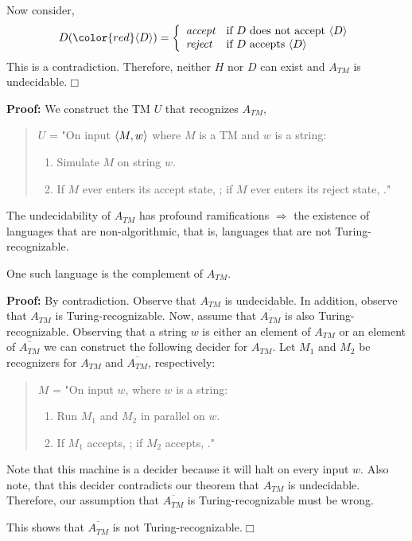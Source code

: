 \documentclass[a4paper,blends,pdf,colorBG,slideColor]{prosper}
\begin{document}
{\small
Now consider,
\[
D({\color{red}\encode{D}}) = \left \{
\begin{array}{ll}
\mbox{\accept} & \mbox{if $D$ does not accept $\encode{D}$}\\
\mbox{\reject} & \mbox{if $D$ accepts $\encode{D}$}
\end{array}
\right .
\]
This is a contradiction.  Therefore, neither $H$ nor $D$ can exist and $A_{TM}$ is
undecidable.$\Box$
}
\es

{\bf Proof:} We construct the TM $U$ that recognizes $A_{TM}$,
\begin{quote}
$U$ = "On input $\langle {M,w} \rangle$ where $M$ is a TM and $w$ is a string:
\begin{enumerate}
\item Simulate $M$ on string $w$.
\item If $M$ ever enters its accept state, \accept; if $M$ ever enters its reject state, \reject."
\end{enumerate}
\end{quote}
\es


The undecidability  of $A_{TM}$ has profound ramifications $\Rightarrow$ the existence of languages that are non-algorithmic, that is, languages that are not Turing-recognizable.


One such language is the complement of $A_{TM}$.
\es


{\bf Proof:} By contradiction. Observe that $A_{TM}$ is undecidable.  In addition, observe
that $A_{TM}$ is Turing-recognizable.  Now, assume that $\overline{A_{TM}}$ is also
Turing-recognizable.  Observing that a string $w$ is either an element of $A_{TM}$
or an element of $\overline{A_{TM}}$ we can construct the following decider for
$A_{TM}$.
Let $M_1$ and $M_2$ be recognizers for $A_{TM}$ and $\overline{A_{TM}}$, respectively:

\begin{quote}
$M$ = "On input $w$, where $w$ is a string:
\begin{enumerate}
\item Run $M_1$ and $M_2$ in parallel on $w$.
\item If $M_1$ accepts, \accept; if $M_2$ accepts, \reject."
\end{enumerate}
\end{quote}

Note that this machine is a decider because it will halt on every input $w$.  
Also note, that this decider contradicts our theorem that $A_{TM}$ is 
undecidable.  Therefore, our assumption that $\overline{A_{TM}}$
is Turing-recognizable must be wrong.

This shows that $\overline{A_{TM}}$ is not Turing-recognizable.$\Box$
\es
\end{document}

